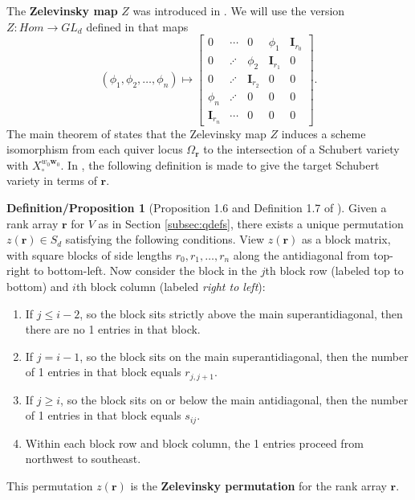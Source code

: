 \documentclass[reqno]{amsart}
\numberwithin{equation}{section}
\theoremstyle{definition}
\newtheorem{defprop}[theorem]{Definition/Proposition}
\theoremstyle{remark}
\begin{document}
The \textbf{Zelevinsky map} $Z$ was introduced in \cite{Zel85}. We will use the version $Z:Hom \to GL_d$ defined in \cite{kms06} that maps
\[(\phi_1,\phi_2,\dots,\phi_n) \mapsto \begin{bmatrix}
    0 & \cdots & 0 & \phi_1 & \mathbf{I}_{r_0}\\
    0 & \iddots & \phi_2 & \mathbf{I}_{r_1} & 0\\
    0 & \iddots & \mathbf{I}_{r_2} & 0 & 0\\
    \phi_n & \iddots & 0 & 0 & 0\\
    \mathbf{I}_{r_n} & \cdots & 0 & 0 & 0
\end{bmatrix}.\]
The main theorem of \cite{lm98} states that the Zelevinsky map $Z$ induces a scheme isomorphism from each quiver locus $\Omega_{\mathbf{r}}$ to the intersection of a Schubert variety with $X_\circ^{w_0 \mathbf{w}_0}$. In \cite{kms06}, the following definition is made to give the target Schubert variety in terms of $\mathbf{r}$.
\begin{defprop}[Proposition 1.6 and Definition 1.7 of \cite{kms06}]\label{defprop:zel}
Given a rank array $\mathbf{r}$ for $V$ as in Section \ref{subsec:qdefs}, there exists a unique permutation $z(\mathbf{r}) \in S_d$ satisfying the following conditions.
View $z(\mathbf{r})$ as a block matrix, with square blocks of side lengths $r_0,r_1,\dots,r_n$ along the antidiagonal
 from top-right to bottom-left. Now consider the block in the $j$th block row (labeled top to bottom) and $i$th block column (labeled \emph{right to left}):
\begin{enumerate}
    \item If $j \leq i-2$, so the block sits strictly above the main superantidiagonal, then there are no 1 entries in that block.
    \item If $j=i-1$, so the block sits on the main superantidiagonal, then the number of 1 entries in that block equals $r_{j,j+1}$.
    \item If $j \geq i$, so the block sits on or below the main antidiagonal, then the number of 1 entries in that block equals $s_{ij}$.
    \item Within each block row and block column, the 1 entries proceed from northwest to southeast.
\end{enumerate}
This permutation $z(\mathbf{r})$ is the \textbf{Zelevinsky permutation} for the rank array $\mathbf{r}$. 
\end{defprop}
\end{document}

